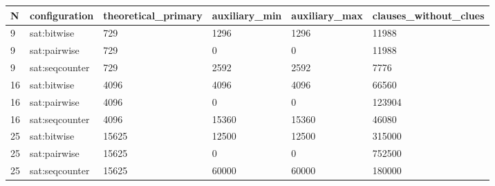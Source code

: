 \begin{tabular}{llllll}
\hline
N & configuration & theoretical\_primary & auxiliary\_min & auxiliary\_max & clauses\_without\_clues \\
\hline
9 & sat:bitwise & 729 & 1296 & 1296 & 11988 \\
9 & sat:pairwise & 729 & 0 & 0 & 11988 \\
9 & sat:seqcounter & 729 & 2592 & 2592 & 7776 \\
16 & sat:bitwise & 4096 & 4096 & 4096 & 66560 \\
16 & sat:pairwise & 4096 & 0 & 0 & 123904 \\
16 & sat:seqcounter & 4096 & 15360 & 15360 & 46080 \\
25 & sat:bitwise & 15625 & 12500 & 12500 & 315000 \\
25 & sat:pairwise & 15625 & 0 & 0 & 752500 \\
25 & sat:seqcounter & 15625 & 60000 & 60000 & 180000 \\
\hline
\end{tabular}
